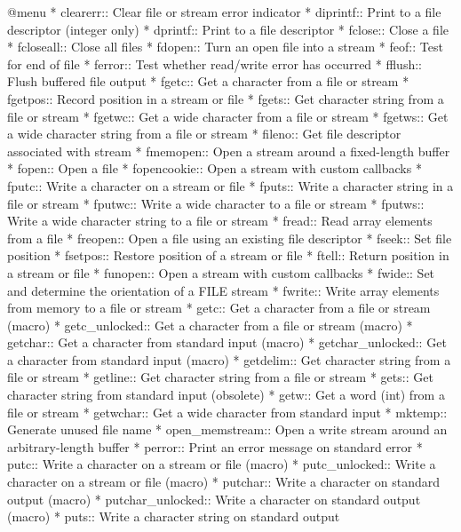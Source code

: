 @menu
* clearerr::    Clear file or stream error indicator
* diprintf::    Print to a file descriptor (integer only)
* dprintf::     Print to a file descriptor
* fclose::      Close a file
* fcloseall::   Close all files
* fdopen::      Turn an open file into a stream
* feof::        Test for end of file
* ferror::      Test whether read/write error has occurred
* fflush::      Flush buffered file output
* fgetc::       Get a character from a file or stream
* fgetpos::     Record position in a stream or file
* fgets::       Get character string from a file or stream
* fgetwc::      Get a wide character from a file or stream
* fgetws::      Get a wide character string from a file or stream
* fileno::      Get file descriptor associated with stream
* fmemopen::    Open a stream around a fixed-length buffer
* fopen::       Open a file
* fopencookie:: Open a stream with custom callbacks
* fputc::       Write a character on a stream or file
* fputs::       Write a character string in a file or stream
* fputwc::      Write a wide character to a file or stream
* fputws::      Write a wide character string to a file or stream
* fread::       Read array elements from a file
* freopen::     Open a file using an existing file descriptor
* fseek::       Set file position
* fsetpos::     Restore position of a stream or file
* ftell::       Return position in a stream or file
* funopen::     Open a stream with custom callbacks
* fwide::	Set and determine the orientation of a FILE stream
* fwrite::      Write array elements from memory to a file or stream
* getc::        Get a character from a file or stream (macro)
* getc_unlocked::	Get a character from a file or stream (macro)
* getchar::     Get a character from standard input (macro)
* getchar_unlocked::	Get a character from standard input (macro)
* getdelim::    Get character string from a file or stream
* getline::     Get character string from a file or stream
* gets::        Get character string from standard input (obsolete)
* getw::        Get a word (int) from a file or stream
* getwchar::    Get a wide character from standard input
* mktemp::      Generate unused file name
* open_memstream::	Open a write stream around an arbitrary-length buffer
* perror::      Print an error message on standard error
* putc::        Write a character on a stream or file (macro)
* putc_unlocked::	Write a character on a stream or file (macro)
* putchar::     Write a character on standard output (macro)
* putchar_unlocked::	Write a character on standard output (macro)
* puts::        Write a character string on standard output
